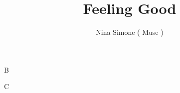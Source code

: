 \documentclass[DIV13,a4paper]{scrartcl}
\title{{\myfont Feeling Good}}
\author{Nina Simone ( Muse ) }
\date{}
\begin{document}
\maketitle


\begin{row}[cellsep=0.75cm]{2}{2}
	\begin{cell}{1}
	
	\end{cell}
	\begin{cell}{1}
B
	\end{cell}
	\begin{cell}{1}
C
	\end{cell}
\end{row}
\end{document}
